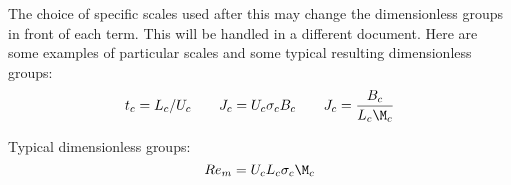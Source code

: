 \documentclass[11pt]{article}
\begin{document}
The choice of specific scales used after this may change the dimensionless groups in front of each term. This will be handled in a different document. Here are some examples of particular scales and some typical resulting dimensionless groups:
\begin{equation}\begin{aligned}
	t_c = L_c/ U_c \qquad
	J_c = U_c \sigma_c B_c \qquad
	J_c = \frac{B_c}{L_c \M_c}
\end{aligned}\end{equation}

Typical dimensionless groups:
\begin{equation}
	Re_m = U_c L_c \sigma_c \M_c
\end{equation}
\end{document}
